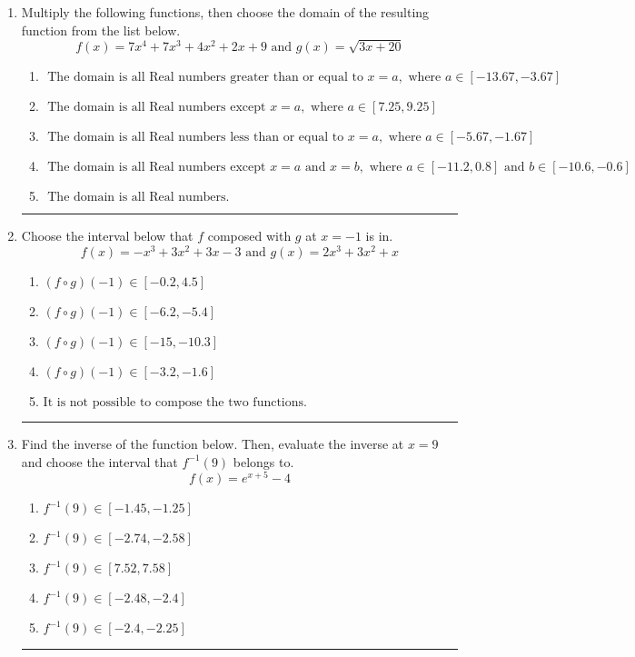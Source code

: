 \documentclass[14pt]{extbook}
\newcommand{\litem}[1]{\item#1\hspace*{-1cm}\rule{\textwidth}{0.4pt}}
\begin{document}
\begin{enumerate}
{\begin{enumerate}[label=\Alph*.]
\end{enumerate} }
\litem{
Multiply the following functions, then choose the domain of the resulting function from the list below.\[ f(x) = 7x^{4} +7 x^{3} +4 x^{2} +2 x + 9 \text{ and } g(x) = \sqrt{3x+20}  \]\begin{enumerate}[label=\Alph*.]
\item \( \text{ The domain is all Real numbers greater than or equal to } x = a, \text{ where } a \in [-13.67, -3.67] \)
\item \( \text{ The domain is all Real numbers except } x = a, \text{ where } a \in [7.25, 9.25] \)
\item \( \text{ The domain is all Real numbers less than or equal to } x = a, \text{ where } a \in [-5.67, -1.67] \)
\item \( \text{ The domain is all Real numbers except } x = a \text{ and } x = b, \text{ where } a \in [-11.2, 0.8] \text{ and } b \in [-10.6, -0.6] \)
\item \( \text{ The domain is all Real numbers. } \)

\end{enumerate} }
\litem{
Choose the interval below that $f$ composed with $g$ at $x=-1$ is in.\[ f(x) = -x^{3} +3 x^{2} +3 x -3 \text{ and } g(x) = 2x^{3} +3 x^{2} +x \]\begin{enumerate}[label=\Alph*.]
\item \( (f \circ g)(-1) \in [-0.2, 4.5] \)
\item \( (f \circ g)(-1) \in [-6.2, -5.4] \)
\item \( (f \circ g)(-1) \in [-15, -10.3] \)
\item \( (f \circ g)(-1) \in [-3.2, -1.6] \)
\item \( \text{It is not possible to compose the two functions.} \)

\end{enumerate} }
\litem{
Find the inverse of the function below. Then, evaluate the inverse at $x = 9$ and choose the interval that $f^{-1}(9)$ belongs to.\[ f(x) = e^{x+5}-4 \]\begin{enumerate}[label=\Alph*.]
\item \( f^{-1}(9) \in [-1.45, -1.25] \)
\item \( f^{-1}(9) \in [-2.74, -2.58] \)
\item \( f^{-1}(9) \in [7.52, 7.58] \)
\item \( f^{-1}(9) \in [-2.48, -2.4] \)
\item \( f^{-1}(9) \in [-2.4, -2.25] \)

\end{enumerate} }
\end{enumerate}
\end{document}
